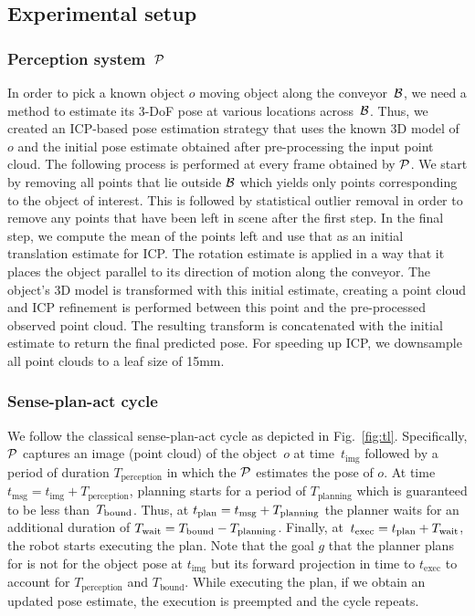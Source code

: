 \documentclass[conference]{IEEEtran}
\begin{document}
\subsection{Experimental setup}
\subsubsection{Perception system~$\mathcal{P}$}
In order to pick a known object $o$ moving object along the conveyor~$\mathcal{B}$, we need a method to estimate its 3-DoF pose at various locations across~$\mathcal{B}$. Thus, we created an ICP-based pose estimation strategy that uses the known 3D model of~$o$ and the initial pose estimate obtained after pre-processing the input point cloud. 
%
The following process is performed at every frame obtained by $\mathcal{P}$. 
We start by removing all points that lie outside $\mathcal{B}$ which yields only points corresponding to the object of interest. 
This is followed by statistical outlier removal in order to remove any points that have been left in scene after the first step. 
In the final step, we compute the mean of the points left and use that as an initial translation estimate for ICP. 
The rotation estimate is applied in a way that it places the object parallel to its direction of motion along the conveyor. The object's 3D model is transformed with this initial estimate, creating a point cloud and ICP refinement is performed between this point and the pre-processed observed point cloud. The resulting transform is concatenated with the initial estimate to return the final predicted pose. For speeding up ICP, we downsample all point clouds to a leaf size of 15mm.

\subsubsection{Sense-plan-act cycle}
We follow the classical sense-plan-act cycle as depicted in Fig.~\ref{fig:tl}.
%
Specifically, 
$\mathcal{P}$ captures an image (point cloud) of the object~$o$ at time~$t_{\textrm{img}}$
followed by a period of duration $T_{\textrm{perception}}$ in which the $\mathcal{P}$ estimates the pose of $o$.
At time $t_{\textrm{msg}} = t_{\textrm{img}} + T_{\textrm{perception}}$, planning starts for a period of $T_{\textrm{planning}}$ which is guaranteed to be less than~$T_{\textrm{bound}}$.
Thus, at $t_{\textrm{plan}} = t_{\textrm{msg}} + T_{\rm planning}$ the planner waits for an additional duration of $T_{\rm wait} = T_{\textrm{bound}} - T_{\rm planning}$.
Finally, at~$t_{\textrm{exec}} = t_{\textrm{plan}} + T_{\rm wait}$, the robot starts executing the plan. Note that the goal $g$ that the planner plans for is not for the object pose at $t_{\textrm{img}}$ but its forward projection in time to $t_{\textrm{exec}}$ to account for $T_{\textrm{perception}}$ and $T_{\textrm{bound}}$.
While executing the plan, if we obtain an updated pose estimate, the execution is preempted and the cycle repeats.
\end{document}
